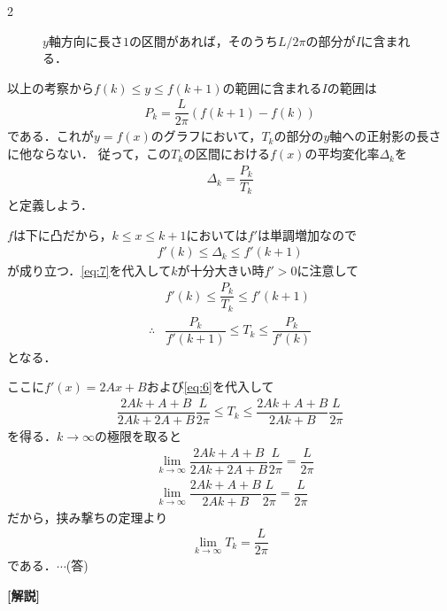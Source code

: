 \documentclass[../../main.tex]{subfiles}
\begin{document}
\begin{multicols}{2}
\begin{figure}[H]
    \caption{$y$軸方向に長さ$1$の区間があれば，そのうち$L/2\pi$の部分が$I$に含まれる．}
    \label{2001-3:fig:3}
  \end{figure}

  以上の考察から$f(k) \le y \le f(k+1)$の範囲に含まれる$I$の範囲は
  \begin{align}
    P_{k} = \dfrac{L}{2\pi}\left(f(k+1)-f(k)\right) \label{eq:6}
  \end{align}
  である．これが$y=f(x)$のグラフにおいて，$T_k$の部分の$y$軸への正射影の長さに他ならない．
  従って，この$T_k$の区間における$f(x)$の平均変化率$\Delta_{k}$を
  \begin{align}
    \Delta_{k} = \dfrac{P_{k}}{T_{k}} \label{eq:7}
  \end{align}
  と定義しよう．

  $f$は下に凸だから，$k \le x \le k+1$においては$f'$は単調増加なので
  \begin{align}
    f'(k) \le \Delta_{k} \le f'(k+1) \label{eq:8}
  \end{align}
  が成り立つ．\cref{eq:7}を代入して$k$が十分大きい時$f'>0$に注意して
  \begin{align}
    & f'(k) \le \dfrac{P_{k}}{T_{k}}  \le f'(k+1)        \\
    \therefore
    & \dfrac{P_k}{f'(k+1)} \le T_k \le \dfrac{P_k}{f'(k)}
  \end{align}
  となる．

  ここに$f'(x) = 2Ax+B$および\cref{eq:6}を代入して
  \begin{align}
    \dfrac{2Ak+A+B}{2Ak+2A+B} \dfrac{L}{2\pi} \le T_k \le \dfrac{2Ak+A+B}{2Ak+B} \dfrac{L}{2\pi}
  \end{align}
  を得る．$k\to\infty$の極限を取ると
  \begin{align}
    & \lim_{k\to\infty} \dfrac{2Ak+A+B}{2Ak+2A+B} \dfrac{L}{2\pi} = \dfrac{L}{2\pi} \\
    & \lim_{k\to\infty}  \dfrac{2Ak+A+B}{2Ak+B} \dfrac{L}{2\pi}   = \dfrac{L}{2\pi}
  \end{align}
  だから，挟み撃ちの定理より
  \begin{align}
    \lim_{k\to\infty} T_{k} = \dfrac{L}{2\pi}
  \end{align}
  である．$\cdots$(答)

  {\bf [解説]}

  \newpage
\end{multicols}
\end{document}
